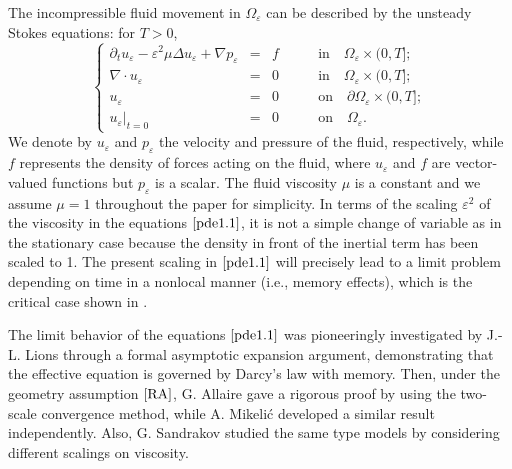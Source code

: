 \documentclass[13pt,CJK]{article}
\theoremstyle{plain}                       %
\theoremstyle{remark}
\numberwithin{equation}{section}
\begin{document}
The incompressible fluid movement in $\Omega_\varepsilon$
can be described by the unsteady Stokes equations:
for $T>0$,
\begin{equation}\label{pde1.1}
\left\{
\begin{aligned}
\partial_t u_{\varepsilon}-\varepsilon^2
\mu\Delta u_{\varepsilon}+\nabla p_{\varepsilon}
&=&f\qquad&\text{in}\quad \Omega_{\varepsilon}\times(0,T];\\
\nabla\cdot u_{\varepsilon}&=&0\qquad&\text{in}\quad \Omega_{\varepsilon}\times(0,T];\\
u_{\varepsilon}&=&0\qquad&\text{on}\quad \partial\Omega_{\varepsilon}\times (0,T];\\
u_{\varepsilon}|_{t=0}&=&0\qquad&\text{on}\quad \Omega_{\varepsilon}.
\end{aligned}\right.
\end{equation}
We denote by $u_\varepsilon$ and $p_\varepsilon$ the velocity and
pressure of the fluid, respectively, while $f$ represents the density of forces acting
on the fluid, where $u_\varepsilon$ and $f$ are vector-valued functions but
$p_\varepsilon$ is a scalar. The fluid viscosity $\mu$ is a constant and
we assume $\mu=1$ throughout the paper for simplicity.
In terms of the scaling $\varepsilon^2$ of the viscosity in the equations $\eqref{pde1.1}$, it is not a simple change of variable as in the stationary case because the density in front of the inertial
term has been scaled to 1.
The present scaling in $\eqref{pde1.1}$ will precisely lead to a limit problem depending on time in a nonlocal manner (i.e., memory effects),
which is the critical case shown in \cite{Sandrakov97}.

The limit behavior of the equations $\eqref{pde1.1}$ was pioneeringly investigated by J.-L. Lions \cite{Lions81} through a formal asymptotic expansion argument,
demonstrating that the effective equation is governed by Darcy's law with memory. Then, under the geometry assumption $\eqref{RA}$,
G. Allaire \cite{Allaire92} gave a rigorous proof
by using the two-scale convergence method,
while A. Mikeli\'c \cite{Mikelic94} developed a similar result independently.
Also, G. Sandrakov \cite{Sandrakov97} studied the same type models by
considering different scalings on viscosity.
\end{document}
